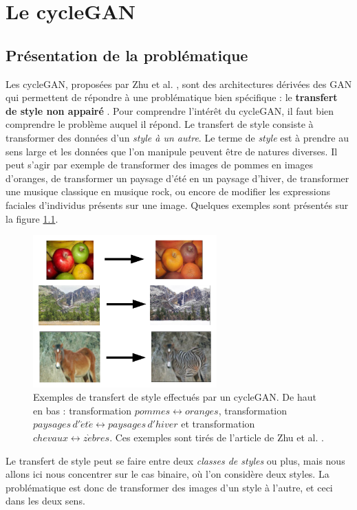 \chapter{Le cycleGAN}

\section{Présentation de la problématique}


Les cycleGAN, proposées par Zhu et al. \cite{zhu_unpaired_2018}, sont des architectures dérivées des GAN qui permettent de répondre à une problématique bien spécifique : le \textbf{transfert de style non appairé} \cite{gatys_image_2016}. Pour comprendre l’intérêt du cycleGAN, il faut bien comprendre le problème auquel il répond.
Le transfert de style consiste à transformer des données d'un \textit{style à un autre}. Le terme de \textit{style} est à prendre au sens large et les données que l'on manipule peuvent être de natures diverses. Il peut s'agir par exemple de transformer des images de pommes en images d'oranges, de transformer un paysage d'été en un paysage d'hiver, de transformer une musique classique en musique rock, ou encore de modifier les expressions faciales d'individus présents sur une image. Quelques exemples sont présentés sur la figure \ref{cycle_exemples}.

\begin{figure}[!h]
\centering
\includegraphics[width=200pt,valign=t]{"images/cycle/cycle_exemples"}
\caption{Exemples de transfert de style effectués par un cycleGAN. De haut en bas : transformation $pommes \leftrightarrow oranges$, transformation $paysages \, d'\acute{e} t \acute{e} \leftrightarrow paysages\,d'hiver$ et transformation $chevaux \leftrightarrow z\grave{e}bres$. Ces exemples sont tirés de l'article de Zhu et al. \cite{zhu_unpaired_2018}.}
\label{cycle_exemples}
\end{figure}


Le transfert de style peut se faire entre deux \textit{classes de styles} ou plus, mais nous allons ici nous concentrer sur le cas binaire, où l'on considère deux styles. La problématique est donc de transformer des images d'un style à l'autre, et ceci dans les deux sens.

